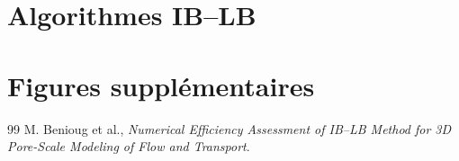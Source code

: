 \documentclass[12pt,a4paper]{report}
\begin{document}
\section{Algorithmes IB–LB}
\section{Figures supplémentaires}


\begin{thebibliography}{99}
M. Benioug et al., \textit{Numerical Efficiency Assessment of IB–LB Method for 3D Pore-Scale Modeling of Flow and Transport}.
\end{thebibliography}
\end{document}
